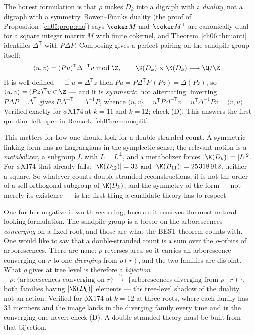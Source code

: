 \begin{remark}\label{ch06:rem:pairing}
The honest formulation is that $\rho$ makes $D_k$ into a digraph with a \emph{duality}, not a
digraph with a symmetry. Bowen--Franks duality (the proof of Proposition~\ref{ch05:prop:rho}) says
$\coker M$ and $\coker M^{\mathsf T}$ are canonically dual for a square integer matrix $M$
with finite cokernel, and Theorem~\ref{ch06:thm:anti} identifies $\Delta^{\mathsf T}$ with
$P\Delta P$. Composing gives a perfect pairing on the sandpile group itself:
\[
  \langle u,v\rangle=(Pu)^{\mathsf T}\Delta^{-\mathsf T}v \bmod \Z,
  \qquad \K(D_k)\times\K(D_k)\longrightarrow\Q/\Z .
\]
It is well defined --- if $u=\Delta^{\mathsf T}z$ then $Pu=P\Delta^{\mathsf T}P\,(Pz)=
\Delta(Pz)$, so $\langle u,v\rangle=(Pz)^{\mathsf T}v\in\Z$ --- and it is
\emph{symmetric}, not alternating: inverting $P\Delta P=\Delta^{\mathsf T}$ gives
$P\Delta^{-\mathsf T}=\Delta^{-1}P$, whence
$\langle u,v\rangle=u^{\mathsf T}P\Delta^{-\mathsf T}v=u^{\mathsf T}\Delta^{-1}Pv=
\langle v,u\rangle$. Verified exactly for $\phi$X174 at $k=11$ and $k=12$; check (D). This
answers the first question left open in Remark~\ref{ch05:rem:nosplit}.

This matters for how one should look for a double-stranded count. A symmetric linking form
has no Lagrangians in the symplectic sense; the relevant notion is a \emph{metabolizer}, a
subgroup $L$ with $L=L^{\perp}$, and a metabolizer forces $|\K(D_k)|=|L|^{2}$. For $\phi$X174
that already fails: $|\K(D_{12})|=33$ and $|\K(D_{11})|=25\,318\,912$, neither a square. So
whatever counts double-stranded reconstructions, it is not the order of a self-orthogonal
subgroup of $\K(D_k)$, and the symmetry of the form --- not merely its existence --- is the
first thing a candidate theory has to respect.

One further negative is worth recording, because it removes the most natural-looking
formulation. The sandpile group is a torsor on the arborescences \emph{converging} on a fixed
root, and those are what the BEST theorem counts with. One would like to say that a
double-stranded count is a sum over the $\rho$-orbits of arborescences. There are none:
$\rho$ reverses arcs, so it carries an arborescence converging on $r$ to one
\emph{diverging} from $\rho(r)$, and the two families are disjoint. What $\rho$ gives at
tree level is therefore a \emph{bijection}
\[
  \rho\colon \{\text{arborescences converging on } r\}
  \;\xrightarrow{\ \sim\ }\;
  \{\text{arborescences diverging from } \rho(r)\},
\]
both families having $|\K(D_k)|$ elements --- the tree-level shadow of the duality, not an
action. Verified for $\phi$X174 at $k=12$ at three roots, where each family has $33$ members
and the image lands in the diverging family every time and in the converging one never;
check (D). A double-stranded theory must be built from that bijection.
\end{remark}

